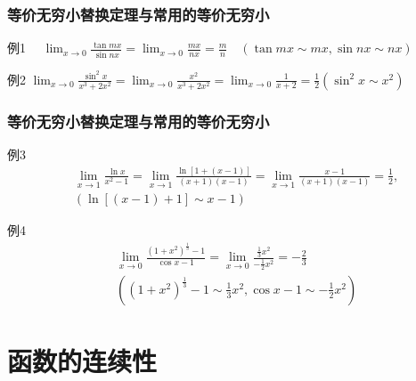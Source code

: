 \documentclass[
10pt,
aspectratio=43,
]{beamer}
\begin{document}
\begin{frame}
	\frametitle{等价无穷小替换定理与常用的等价无穷小}
	\begin{exampleblock}{例1}
		$ \quad \lim _{x \rightarrow 0} \frac{\tan m x}{\sin n x}=\lim _{x \rightarrow 0} \frac{m x}{n x}=\frac{m}{n} \quad(\tan m x \sim m x, \sin n x\sim n x)$
	\end{exampleblock}
	\pause
	\begin{exampleblock}{例2}
		$ \lim _{x \rightarrow 0} \frac{\sin ^2 x}{x^3+2 x^2}=\lim _{x \rightarrow 0} \frac{x^2}{x^3+2 x^2}=\lim _{x \rightarrow 0} \frac{1}{x+2}=\frac{1}{2}\left(\sin ^2 x \sim x^2\right)$
	\end{exampleblock}
\end{frame}
\begin{frame}
	\frametitle{等价无穷小替换定理与常用的等价无穷小}
	\begin{exampleblock}{例3}
		\begin{equation*}
			\begin{aligned}
				  & \lim _{x \rightarrow 1} \frac{\ln x}{x^2-1}=\lim _{x \rightarrow 1} \frac{\ln [1+(x-1)]}{(x+1)(x-1)}=\lim _{x \rightarrow 1} \frac{x-1}{(x+1)(x-1)}=\frac{1}{2}, \\
				  & (\ln [(x-1)+1] \sim x-1)                                                                                                                                         
			\end{aligned}
		\end{equation*}
	\end{exampleblock}
	\pause
	\begin{exampleblock}{例4} \begin{equation*}
		\begin{aligned}
			  & \lim _{x \rightarrow 0} \frac{\left(1+x^2\right)^{\frac{1}{3}}-1}{\cos x-1}=\lim _{x \rightarrow 0} \frac{\frac{1}{3} x^2}{-\frac{1}{2} x^2}= -\frac{2}{3} \\
			  & \left(\left(1+x^2\right)^{\frac{1}{3}}-1 \sim \frac{1}{3} x^2, \cos x-1 \sim-\frac{1}{2} x^2\right)                                                        
		\end{aligned}
		\end{equation*}
	\end{exampleblock}
\end{frame}

\section{函数的连续性}
\end{document}
